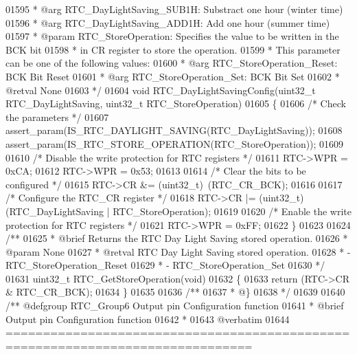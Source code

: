\begin{DoxyCode}
01595 \textcolor{comment}{  *            @arg RTC\_DayLightSaving\_SUB1H: Substract one hour (winter time)}
01596 \textcolor{comment}{  *            @arg RTC\_DayLightSaving\_ADD1H: Add one hour (summer time)}
01597 \textcolor{comment}{  * @param  RTC\_StoreOperation: Specifies the value to be written in the BCK bit }
01598 \textcolor{comment}{  *                            in CR register to store the operation.}
01599 \textcolor{comment}{  *          This parameter can be one of the following values:}
01600 \textcolor{comment}{  *            @arg RTC\_StoreOperation\_Reset: BCK Bit Reset}
01601 \textcolor{comment}{  *            @arg RTC\_StoreOperation\_Set: BCK Bit Set}
01602 \textcolor{comment}{  * @retval None}
01603 \textcolor{comment}{  */}
01604 \textcolor{keywordtype}{void} RTC_DayLightSavingConfig(uint32\_t RTC\_DayLightSaving, uint32\_t RTC\_StoreOperation)
01605 \{
01606   \textcolor{comment}{/* Check the parameters */}
01607   assert_param(IS\_RTC\_DAYLIGHT\_SAVING(RTC\_DayLightSaving));
01608   assert_param(IS\_RTC\_STORE\_OPERATION(RTC\_StoreOperation));
01609 
01610   \textcolor{comment}{/* Disable the write protection for RTC registers */}
01611   RTC->WPR = 0xCA;
01612   RTC->WPR = 0x53;
01613 
01614   \textcolor{comment}{/* Clear the bits to be configured */}
01615   RTC->CR &= (uint32\_t)~(RTC_CR_BCK);
01616 
01617   \textcolor{comment}{/* Configure the RTC\_CR register */}
01618   RTC->CR |= (uint32\_t)(RTC\_DayLightSaving | RTC\_StoreOperation);
01619 
01620   \textcolor{comment}{/* Enable the write protection for RTC registers */}
01621   RTC->WPR = 0xFF;
01622 \}
01623 
01624 \textcolor{comment}{/**}
01625 \textcolor{comment}{  * @brief  Returns the RTC Day Light Saving stored operation.}
01626 \textcolor{comment}{  * @param  None}
01627 \textcolor{comment}{  * @retval RTC Day Light Saving stored operation.}
01628 \textcolor{comment}{  *          - RTC\_StoreOperation\_Reset}
01629 \textcolor{comment}{  *          - RTC\_StoreOperation\_Set       }
01630 \textcolor{comment}{  */}
01631 uint32\_t RTC_GetStoreOperation(\textcolor{keywordtype}{void})
01632 \{
01633   \textcolor{keywordflow}{return} (RTC->CR & RTC_CR_BCK);
01634 \}
01635 
01636 \textcolor{comment}{/**}
01637 \textcolor{comment}{  * @\}}
01638 \textcolor{comment}{  */}
01639 
01640 \textcolor{comment}{/** @defgroup RTC\_Group6 Output pin Configuration function}
01641 \textcolor{comment}{ *  @brief   Output pin Configuration function }
01642 \textcolor{comment}{ *}
01643 \textcolor{comment}{@verbatim   }
01644 \textcolor{comment}{ ===============================================================================}

\end{DoxyCode}
